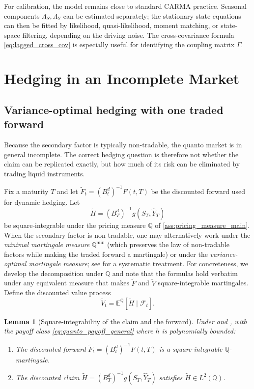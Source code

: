 \documentclass[10pt,a4paper,reqno]{amsart}
\newtheorem{lemma}[theorem]{Lemma}
\newcommand{\E}{\mathbb{E}}
\newcommand{\Q}{\mathbb{Q}}
\newcommand{\F}{\mathcal{F}}
\newcommand{\1}{\mathbbm{1}}
\begin{document}
For calibration, the model remains close to standard CARMA practice. Seasonal
components $\Lambda_S,\Lambda_Y$ can be estimated separately; the stationary
state equations can then be fitted by likelihood, quasi-likelihood, moment
matching, or state-space filtering, depending on the driving noise. The
cross-covariance formula \eqref{eq:lagged_cross_cov} is especially useful for
identifying the coupling matrix $\Gamma$.

\section{Hedging in an Incomplete Market}\label{sec:hedging-strategies}

\subsection{Variance-optimal hedging with one traded forward}

Because the secondary factor is typically non-tradable, the quanto market is in
general incomplete. The correct hedging question is therefore not whether the
claim can be replicated exactly, but how much of its risk can be eliminated by
trading liquid instruments.

Fix a maturity $T$ and let $\widetilde{F}_t = (B_t^d)^{-1}F(t,T)$ be the
discounted forward used for dynamic hedging. Let
$$
\widetilde{H} = (B_T^d)^{-1} g(S_T,\widehat{Y}_T)
$$
be square-integrable under the pricing measure $\Q$ of
\ref{ass:pricing_measure_main}. When the secondary
factor is non-tradable, one may alternatively work under the \emph{minimal
martingale measure} $\Q^{\min}$ (which preserves the law of non-tradable
factors while making the traded forward a martingale) or under the
\emph{variance-optimal martingale measure}; see \citet{Sch01} for a systematic
treatment. For concreteness, we develop the decomposition under $\Q$ and
note that the formulas hold verbatim under any equivalent measure that makes
$\widetilde{F}$ and $\widetilde{V}$ square-integrable martingales. Define
the discounted value process
$$
\widetilde{V}_t = \E^{\Q}[\widetilde{H}\mid\F_t].
$$

\begin{lemma}[Square-integrability of the claim and the forward]
\label{lem:sq_int}
Under  and , with the payoff
class \eqref{eq:quanto_payoff_general} where $h$ is polynomially bounded:
\begin{enumerate}[label=(\alph*)]
  \item \label{lem:sq_int:F}
    The discounted forward $\widetilde{F}_t = (B_t^d)^{-1}F(t,T)$ is a
    square-integrable $\Q$-martingale.
  \item \label{lem:sq_int:H}
    The discounted claim $\widetilde{H} = (B_T^d)^{-1}g(S_T,\widehat{Y}_T)$
    satisfies $\widetilde{H} \in L^2(\Q)$.
\end{enumerate}
\end{lemma}
\end{document}
